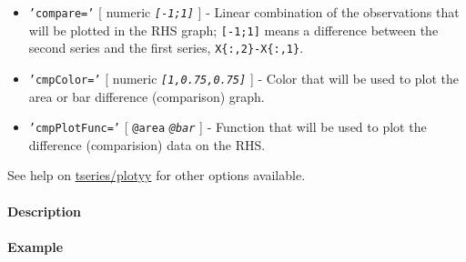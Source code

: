  \begin{itemize}
 \item
   \texttt{'compare='} {[} numeric \textbar{} \emph{\texttt{{[}-1;1{]}}}
   {]} - Linear combination of the observations that will be plotted in
   the RHS graph; \texttt{{[}-1;1{]}} means a difference between the
   second series and the first series, \texttt{X\{:,2\}-X\{:,1\}}.
 \item
   \texttt{'cmpColor='} {[} numeric \textbar{}
   \emph{\texttt{{[}1,0.75,0.75{]}}} {]} - Color that will be used to
   plot the area or bar difference (comparison) graph.
 \item
   \texttt{'cmpPlotFunc='} {[} \texttt{@area} \textbar{}
   \emph{\texttt{@bar}} {]} - Function that will be used to plot the
   difference (comparision) data on the RHS.
 \end{itemize}
 
 See help on \url{tseries/plotyy} for other options available.
 
 \paragraph{Description}
 
 \paragraph{Example}


